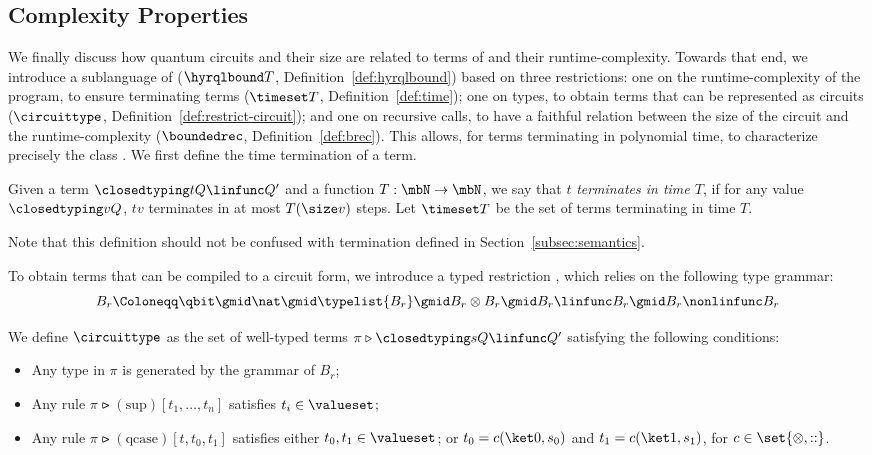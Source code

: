 \subsection{Complexity Properties}\label{subsec:poly}

We finally discuss how quantum circuits and their size are related to terms of
\hyrql{} and their runtime-complexity. Towards that end, we introduce a
sublanguage of \hyrql{} ($\hyrqlbound T$, Definition~\ref{def:hyrqlbound})
based on three restrictions:
one on the runtime-complexity of the program, to ensure terminating terms
($\timeset T$, Definition~\ref{def:time});
one on types, to obtain terms that can be represented as circuits
($\circuittype$, Definition~\ref{def:restrict-circuit});
and one on recursive calls, to have a faithful relation between the size of the
circuit and the runtime-complexity ($\boundedrec$, Definition~\ref{def:brec}).
This allows, for terms terminating in polynomial time, to characterize
precisely the class \fbqp{}. We first define the time termination of a term.

\begin{definition}\label{def:time}
  Given a term $\closedtyping t Q \linfunc Q'$ and a function $T : \mbN \to \mbN$,
  we say that $t$ \emph{terminates in time $T$}, if for any value 
  $\closedtyping v Q$, $tv$ terminates in at most $T(\size v)$ steps.
  Let $\timeset T$ be the set of terms terminating in time $T$.
\end{definition}

Note that this definition should not be confused with termination defined in
Section~\ref{subsec:semantics}.

To obtain terms that can be compiled to a circuit form, we introduce a 
typed restriction \circuittype{}, which relies on the following type grammar:
\[
    B_r \Coloneqq \qbit \gmid \nat \gmid \typelist{B_r} \gmid B_r \otimes
    B_r \gmid B_r \linfunc B_r \gmid B_r \nonlinfunc B_r
\]

\begin{definition}\label{def:restrict-circuit}
  We define $\circuittype$ as the set of well-typed terms $\pi \triangleright
  \closedtyping s Q \linfunc Q'$ satisfying the following conditions:
  \begin{itemize}
    \item Any type in $\pi$ is generated by the grammar of $B_r$;
    \item Any rule $\pi \rightslice (\mathrm{sup})[t_1, \dots, t_n]$
      satisfies $t_i \in \valueset$;
    \item Any rule $\pi \rightslice (\mathrm{qcase})[t, t_0, t_1]$ satisfies
      either $t_0, t_1 \in \valueset$; or $t_0 = c(\ket 0, s_0)$ and
      $t_1 = c(\ket 1, s_1)$, for $c \in \set{\otimes, ::}$.
  \end{itemize}
\end{definition}

